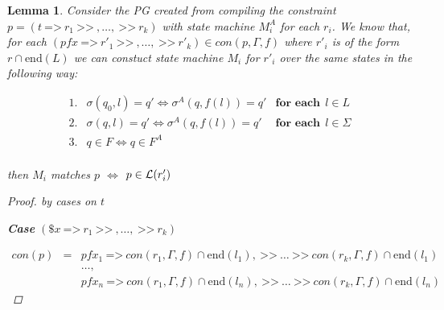 \documentclass[twocolumn, openany]{sig-alternate-10pt}
\newcommand{\Prefer}{\texttt{>>}}
\newcommand{\Path}{\texttt{=>}}
\newtheorem{lem}[thm]{Lemma}
\begin{document}



\begin{lem}
  Consider the PG created from compiling the constraint $p = (t ~\Path~ r_1 ~\Prefer~,\dots, ~\Prefer~ r_k)$ with state machine $M^A_i$ for each $r_i$. We know that, for each $(pfx ~\Path~ r'_1 ~\Prefer~,\dots, ~\Prefer~ r'_k) \in con(p,\Gamma,f)$ where $r'_i$ is of the form $r \cap \text{end}(L)$ we can constuct state machine $M_i$ for $r'_i$ over the same states in the following way:
    
    \[ \begin{array}{lll}
      1. & \sigma(q_0,l) = q' \iff \sigma^A(q,f(l)) = q' & \textbf{for each}~~ l \in L \\
      2. & \sigma(q,l) = q' \iff \sigma^A(q,f(l)) = q' & \textbf{for each}~~ l \in \Sigma \\
      3. & q \in F \iff q \in F^A & \\
    \end{array} \]

  then $M_i$ matches $p$ $\iff$ $p \in \mathcal{L}(r_i')$
  
  \vspace{1em}
  \begin{proof} by cases on $t$

    \vspace{1em}

    \textbf{Case} $(\$x ~\Path~ r_1 ~\Prefer~,\dots, ~\Prefer~ r_k)$

    \[ \begin{array}{lcl}
      con(p) &=& pfx_1 ~\Path~ con(r_1,\Gamma,f) \cap \text{end}(l_1), ~\Prefer~ \dots ~\Prefer~ con(r_k,\Gamma,f) \cap \text{end}(l_1)  \\
             & & \dots, \\
             & & pfx_n ~\Path~ con(r_1,\Gamma,f) \cap \text{end}(l_n), ~\Prefer~ \dots ~\Prefer~ con(r_k,\Gamma,f) \cap \text{end}(l_n)
    \end{array} \]


\end{proof}
\end{lem}
\end{document}
